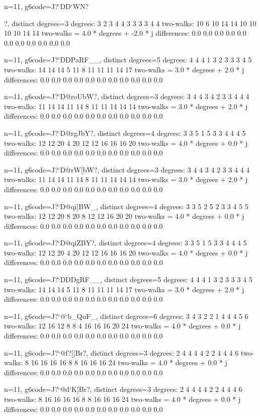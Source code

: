 {{{{{{{n=11, g6code=J?`DD`WN?{?, distinct degrees=3
degrees: 3 2 3 4 4 3 3 3 3 4 4 
two-walks: 10 6 10 14 14 10 10 10 10 14 14 
two-walks = 4.0 * degrees + -2.0 * j
differences: 0.0 0.0 0.0 0.0 0.0 0.0 0.0 0.0 0.0 0.0 0.0 

n=11, g6code=J?`DDPaRF__, distinct degrees=5
degrees: 4 4 4 1 3 2 3 3 3 4 5 
two-walks: 14 14 14 5 11 8 11 11 11 14 17 
two-walks = 3.0 * degrees + 2.0 * j
differences: 0.0 0.0 0.0 0.0 0.0 0.0 0.0 0.0 0.0 0.0 0.0 

n=11, g6code=J?`D@roUbW?, distinct degrees=3
degrees: 3 4 4 3 4 2 3 3 4 4 4 
two-walks: 11 14 14 11 14 8 11 11 14 14 14 
two-walks = 3.0 * degrees + 2.0 * j
differences: 0.0 0.0 0.0 0.0 0.0 0.0 0.0 0.0 0.0 0.0 0.0 

n=11, g6code=J?`D@rgJbY?, distinct degrees=4
degrees: 3 3 5 1 5 3 3 4 4 4 5 
two-walks: 12 12 20 4 20 12 12 16 16 16 20 
two-walks = 4.0 * degrees + 0.0 * j
differences: 0.0 0.0 0.0 0.0 0.0 0.0 0.0 0.0 0.0 0.0 0.0 

n=11, g6code=J?`D@rW[bW?, distinct degrees=3
degrees: 3 4 4 3 4 2 3 3 4 4 4 
two-walks: 11 14 14 11 14 8 11 11 14 14 14 
two-walks = 3.0 * degrees + 2.0 * j
differences: 0.0 0.0 0.0 0.0 0.0 0.0 0.0 0.0 0.0 0.0 0.0 

n=11, g6code=J?`D@qi]BW_, distinct degrees=4
degrees: 3 3 5 2 5 2 3 3 4 5 5 
two-walks: 12 12 20 8 20 8 12 12 16 20 20 
two-walks = 4.0 * degrees + 0.0 * j
differences: 0.0 0.0 0.0 0.0 0.0 0.0 0.0 0.0 0.0 0.0 0.0 

n=11, g6code=J?`D@qiZBY?, distinct degrees=4
degrees: 3 3 5 1 5 3 3 4 4 4 5 
two-walks: 12 12 20 4 20 12 12 16 16 16 20 
two-walks = 4.0 * degrees + 0.0 * j
differences: 0.0 0.0 0.0 0.0 0.0 0.0 0.0 0.0 0.0 0.0 0.0 

n=11, g6code=J?`DDDgRF__, distinct degrees=5
degrees: 4 4 4 1 3 2 3 3 3 4 5 
two-walks: 14 14 14 5 11 8 11 11 11 14 17 
two-walks = 3.0 * degrees + 2.0 * j
differences: 0.0 0.0 0.0 0.0 0.0 0.0 0.0 0.0 0.0 0.0 0.0 

n=11, g6code=J?`@`b_QuF_, distinct degrees=6
degrees: 3 4 3 2 2 1 4 4 4 5 6 
two-walks: 12 16 12 8 8 4 16 16 16 20 24 
two-walks = 4.0 * degrees + 0.0 * j
differences: 0.0 0.0 0.0 0.0 0.0 0.0 0.0 0.0 0.0 0.0 0.0 

n=11, g6code=J?`@f?[]Br?, distinct degrees=3
degrees: 2 4 4 4 4 2 2 4 4 4 6 
two-walks: 8 16 16 16 16 8 8 16 16 16 24 
two-walks = 4.0 * degrees + 0.0 * j
differences: 0.0 0.0 0.0 0.0 0.0 0.0 0.0 0.0 0.0 0.0 0.0 

n=11, g6code=J?`@d`K]Br?, distinct degrees=3
degrees: 2 4 4 4 4 2 2 4 4 4 6 
two-walks: 8 16 16 16 16 8 8 16 16 16 24 
two-walks = 4.0 * degrees + 0.0 * j
differences: 0.0 0.0 0.0 0.0 0.0 0.0 0.0 0.0 0.0 0.0 0.0 

}}}}}}}}
